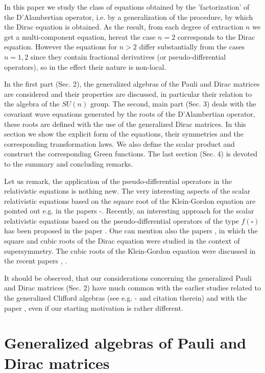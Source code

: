 \documentclass[a4paper,a4paper]{article}
\begin{document}
In this paper we study the class of equations obtained by the
'factorization' of the D'Alambertian operator, i.e. by a generalization of
the procedure, by which the Dirac equation is obtained. As the result, from
each degree of extraction $n$ we get a multi-component equation, hereat the
case $n=2$ corresponds to the Dirac equation. However the equations for $n>2$
differ substantially from the cases $n=1,2$ since they contain fractional
derivatives (or pseudo-differential operators), so in the effect their
nature is non-local.

In the first part (Sec. 2), the generalized algebras of the Pauli and Dirac
matrices are considered and their properties are discussed, in particular
their relation to the algebra of the $SU(n)$ group. The second, main part
(Sec. 3) deals with the covariant wave equations generated by the roots of
the D'Alambertian operator, these roots are defined with the use of the
generalized Dirac matrices. In this section we show the explicit form of the
equations, their symmetries and the corresponding transformation laws. We
also define the scalar product and construct the corresponding Green
functions. The last section (Sec. 4) is devoted to the summary and
concluding remarks.

Let us remark, the application of the pseudo-differential operators in the
relativistic equations is nothing new. The very interesting aspects of the
scalar relativistic equations based on the square root of the Klein-Gordon
equation are pointed out e.g. in the papers \cite{suc}-\cite{smi}. Recently,
an interesting approach for the scalar relativistic equations based on the
pseudo-differential operators of the type $f(\square )$ has been proposed in
the paper \cite{bar}. One can mention also the papers \cite{szw}, \cite{ker}
in which the square and cubic roots of the Dirac equation were studied in
the context of supersymmetry. The cubic roots of the Klein-Gordon equation
were discussed in the recent papers \cite{ply}, \cite{ras}.

It should be observed, that our considerations concerning the generalized
Pauli and Dirac matrices (Sec. 2) have much common with the earlier studies
related to the generalized Clifford algebras (see e.g. \cite{ram}-\cite{tra}
and citation therein) and with the paper \cite{pat}, even if our starting
motivation is rather different.

\section{Generalized algebras of Pauli and Dirac matrices}
\end{document}
